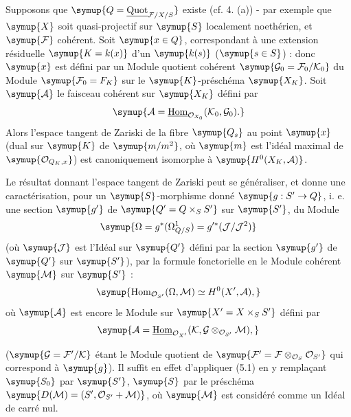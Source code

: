  Supposons que
$\symup{Q=\underline{\operatorname{Quot}}_{\mathcal F/X/S}}$ existe (cf. 4. (a)) - par exemple que
$\symup{X}$ soit quasi-projectif sur $\symup{S}$ localement noethérien, et $\symup{\mathcal F}$
cohérent. Soit $\symup{x\in Q}$, correspondant à une extension résiduelle $\symup{K=k(x)}$
d'un $\symup{k(s)}$ ($\symup{s\in S}$) :
donc $\symup{x}$ est défini par un Module quotient cohérent
$\symup{\mathcal G_0=\mathcal F_0/\mathcal K_0}$ du Module
$\symup{\mathcal F_0=F_K}$ sur le $\symup{K}$-préschéma $\symup{X_K}$. Soit $\symup{\mathcal A}$ le
faisceau cohérent sur $\symup{X_K}$ défini par
\[
\symup{\mathcal A=\underline{\operatorname{Hom}}_{\mathcal O_{X_0}}(\mathcal K_0,\mathcal G_0).}
\]
Alors l'espace tangent de Zariski de la fibre $\symup{Q_s}$ au point $\symup{x}$ (dual sur $\symup{K}$
de $\symup{m/m^2}$, où $\symup{m}$ est l'idéal maximal de
$\symup{\mathcal O_{Q_K,x}}$) est canoniquement isomorphe à $\symup{H^0(X_K,\mathcal A)}$.

Le résultat donnant l'espace tangent de Zariski peut se généraliser, et donne
une caractérisation, pour un $\symup{S}$-morphisme donné $\symup{g:S'\to Q}$, i. e.
une section $\symup{g'}$ de $\symup{Q'=Q\times_SS'}$ sur $\symup{S'}$, du Module
\[
\symup{\Omega=g^*(\Omega^1_{Q/S})=g'^*(\mathcal J/\mathcal J^2)}
\]
(où $\symup{\mathcal J}$ est l'Idéal sur $\symup{Q'}$ défini par la section $\symup{g'}$ de $\symup{Q'}$ sur
$\symup{S'}$), par la formule fonctorielle en le Module cohérent $\symup{\mathcal M}$ sur $\symup{S'}$ :
\[
\symup{\operatorname{Hom}_{\mathcal O_{S'}}(\Omega,\mathcal M)
\simeq H^0(X',\mathcal A),}
\]
où $\symup{\mathcal A}$ est encore le Module sur $\symup{X'=X\times_SS'}$ défini par
\[
\symup{\mathcal A=\underline{\operatorname{Hom}}_{\mathcal O_{X'}}
(\mathcal K,\mathcal G\otimes_{\mathcal O_{S'}}\mathcal M),}
\]

($\symup{\mathcal G=\mathcal F'/\mathcal K}$ étant le Module quotient de
$\symup{\mathcal F'=\mathcal F\otimes_{\mathcal O_S}\mathcal O_{S'}}$ qui correspond à
$\symup{g}$). Il suffit en effet d'appliquer (5.1) en y remplaçant $\symup{S_0}$ par $\symup{S'}$, $\symup{S}$
par le préschéma $\symup{D(\mathcal M)=(S',\mathcal O_{S'}+\mathcal M)}$, où
$\symup{\mathcal M}$ est considéré comme un Idéal de carré nul.

